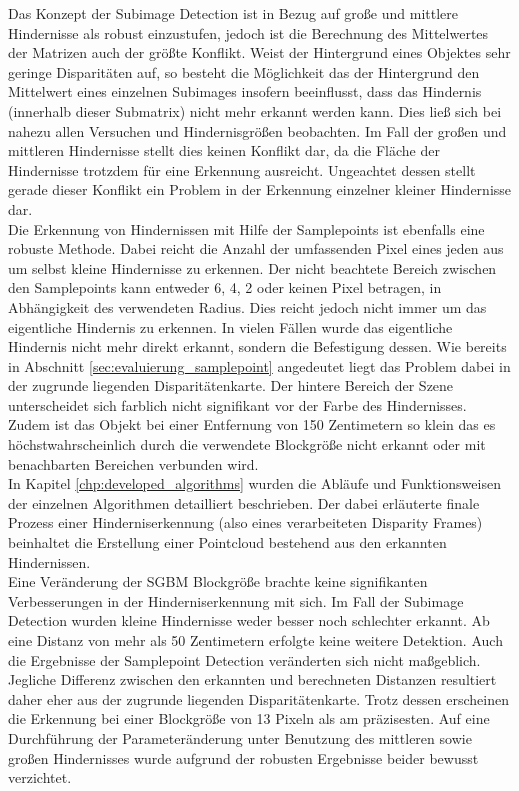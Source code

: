\noindent
Das Konzept der Subimage Detection ist in Bezug auf große und mittlere Hindernisse als robust einzustufen, jedoch ist die Berechnung des Mittelwertes der Matrizen auch der größte Konflikt. Weist der Hintergrund eines Objektes sehr geringe Disparitäten auf, so besteht die Möglichkeit das der Hintergrund den Mittelwert eines einzelnen Subimages insofern beeinflusst, dass das Hindernis (innerhalb dieser Submatrix) nicht mehr erkannt werden kann. Dies ließ sich bei nahezu allen Versuchen und Hindernisgrößen beobachten. Im Fall der großen und mittleren Hindernisse stellt dies keinen Konflikt dar, da die Fläche der Hindernisse trotzdem für eine Erkennung ausreicht. Ungeachtet dessen stellt gerade dieser Konflikt ein Problem in der Erkennung einzelner kleiner Hindernisse dar.\\

\noindent
Die Erkennung von Hindernissen mit Hilfe der Samplepoints ist ebenfalls eine robuste Methode. Dabei reicht die Anzahl der umfassenden Pixel eines jeden aus um selbst kleine Hindernisse zu erkennen. Der nicht beachtete Bereich zwischen den Samplepoints kann entweder 6, 4, 2 oder keinen Pixel betragen, in Abhängigkeit des verwendeten Radius. Dies reicht jedoch nicht immer um das eigentliche Hindernis zu erkennen. In vielen Fällen wurde das eigentliche Hindernis nicht mehr direkt erkannt, sondern die Befestigung dessen. Wie bereits in Abschnitt \ref{sec:evaluierung_samplepoint} angedeutet liegt das Problem dabei in der zugrunde liegenden Disparitätenkarte. Der hintere Bereich der Szene unterscheidet sich farblich nicht signifikant vor der Farbe des Hindernisses. Zudem ist das Objekt bei einer Entfernung von 150 Zentimetern so klein das es höchstwahrscheinlich durch die verwendete Blockgröße nicht erkannt oder mit benachbarten Bereichen verbunden wird.\\

\noindent
In Kapitel \ref{chp:developed_algorithms} wurden die Abläufe und Funktionsweisen der einzelnen Algorithmen detailliert beschrieben. Der dabei erläuterte finale Prozess einer Hinderniserkennung (also eines verarbeiteten Disparity Frames) beinhaltet die Erstellung einer Pointcloud bestehend aus den erkannten Hindernissen.\\

\noindent
Eine Veränderung der SGBM Blockgröße brachte keine signifikanten Verbesserungen in der Hinderniserkennung mit sich. Im Fall der Subimage Detection wurden kleine Hindernisse weder besser noch schlechter erkannt. Ab eine Distanz von mehr als 50 Zentimetern erfolgte keine weitere Detektion. Auch die Ergebnisse der Samplepoint Detection veränderten sich nicht maßgeblich. Jegliche Differenz zwischen den erkannten und berechneten Distanzen resultiert daher eher aus der zugrunde liegenden Disparitätenkarte. Trotz dessen erscheinen die Erkennung bei einer Blockgröße von 13 Pixeln als am präzisesten. Auf eine Durchführung der Parameteränderung unter Benutzung des mittleren sowie großen Hindernisses wurde aufgrund der robusten Ergebnisse beider bewusst verzichtet.\\

